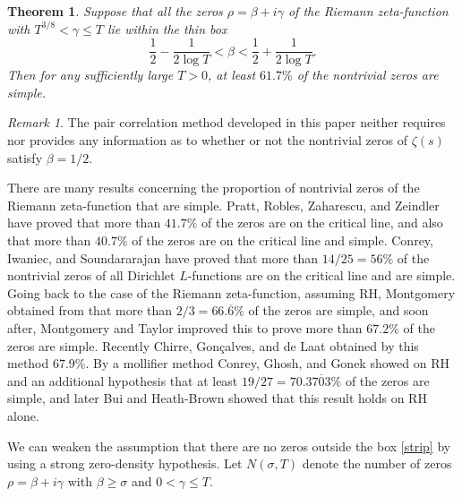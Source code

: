 \documentclass{amsart}
\newcommand{\1}{\mathbbm{1}}
\newtheorem{theorem}{Theorem}%
\theoremstyle{remark}
\newtheorem*{remark}{Remark}
\numberwithin{equation}{section}
\begin{document}
\begin{theorem}\label{thm2} Suppose that all the zeros $\rho = \beta +i\gamma$ of the Riemann zeta-function with $T^{3/8}<\gamma\le T$ lie within the thin box
\begin{equation}\label{strip} \frac1{2} -\frac1{2\log T}< \beta < \frac1{2} + \frac1{2\log T}. \end{equation}
Then for any sufficiently large $T>0$, at least $61.7 \%$ of the nontrivial zeros are simple. \end{theorem}

\begin{remark}
The pair correlation method developed in this paper neither requires nor provides any information as to whether or not the nontrivial zeros of $\zeta(s)$ satisfy $\beta=1/2$.
\end{remark}

There are many results concerning the proportion of nontrivial zeros of the Riemann zeta-function that are simple.
Pratt, Robles, Zaharescu, and Zeindler \cite{Pra20} have proved that more than $41.7\%$ of the zeros are on the critical line, and also that more than $40.7\%$ of the zeros are on the critical line and simple. Conrey, Iwaniec, and Soundararajan \cite{CIS13} have proved that more than $14/25=56\%$ of the nontrivial zeros of all Dirichlet $L$-functions are on the critical line and are simple. Going back to the case of the Riemann zeta-function, assuming RH, Montgomery \cite{Montgomery73} obtained from  that more than $2/3 = 66.\overline{6}\%$ of the zeros are simple, and soon after, Montgomery and Taylor \cite{Montgomery74} improved this to prove more than $ 67.2\%$ of the zeros are simple. Recently Chirre, Gonçalves, and de Laat \cite{CGL2020} obtained by this method $67.9\%$. By a mollifier method Conrey, Ghosh, and Gonek \cite{CGG98} showed on RH and an additional hypothesis that at least $19/27=70.3\overline{703}\%$ of the zeros are simple, and later Bui and Heath-Brown \cite{BuiHB} showed that this result holds on RH alone.

We can weaken the assumption that there are no zeros outside the box \eqref{strip} by using a strong zero-density hypothesis. Let $N(\sigma,T)$ denote the number of zeros $\rho=\beta +i\gamma$ with $\beta \ge \sigma$ and
$0<\gamma \le T$. 
\end{document}

